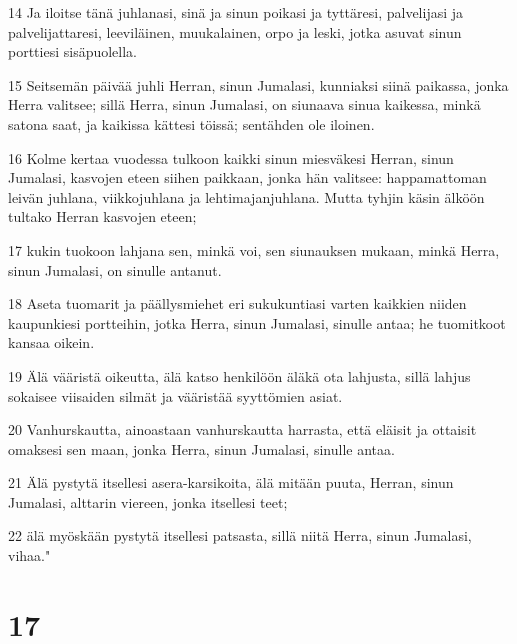 \par 14 Ja iloitse tänä juhlanasi, sinä ja sinun poikasi ja tyttäresi, palvelijasi ja palvelijattaresi, leeviläinen, muukalainen, orpo ja leski, jotka asuvat sinun porttiesi sisäpuolella.
\par 15 Seitsemän päivää juhli Herran, sinun Jumalasi, kunniaksi siinä paikassa, jonka Herra valitsee; sillä Herra, sinun Jumalasi, on siunaava sinua kaikessa, minkä satona saat, ja kaikissa kättesi töissä; sentähden ole iloinen.
\par 16 Kolme kertaa vuodessa tulkoon kaikki sinun miesväkesi Herran, sinun Jumalasi, kasvojen eteen siihen paikkaan, jonka hän valitsee: happamattoman leivän juhlana, viikkojuhlana ja lehtimajanjuhlana. Mutta tyhjin käsin älköön tultako Herran kasvojen eteen;
\par 17 kukin tuokoon lahjana sen, minkä voi, sen siunauksen mukaan, minkä Herra, sinun Jumalasi, on sinulle antanut.
\par 18 Aseta tuomarit ja päällysmiehet eri sukukuntiasi varten kaikkien niiden kaupunkiesi portteihin, jotka Herra, sinun Jumalasi, sinulle antaa; he tuomitkoot kansaa oikein.
\par 19 Älä vääristä oikeutta, älä katso henkilöön äläkä ota lahjusta, sillä lahjus sokaisee viisaiden silmät ja vääristää syyttömien asiat.
\par 20 Vanhurskautta, ainoastaan vanhurskautta harrasta, että eläisit ja ottaisit omaksesi sen maan, jonka Herra, sinun Jumalasi, sinulle antaa.
\par 21 Älä pystytä itsellesi asera-karsikoita, älä mitään puuta, Herran, sinun Jumalasi, alttarin viereen, jonka itsellesi teet;
\par 22 älä myöskään pystytä itsellesi patsasta, sillä niitä Herra, sinun Jumalasi, vihaa."

\chapter{17}

